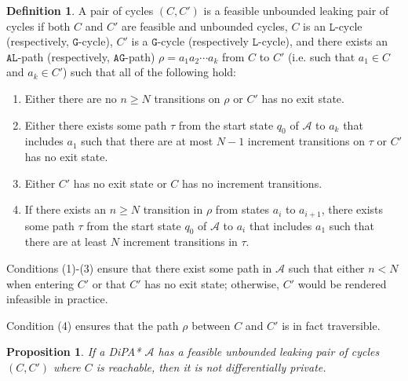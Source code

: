\documentclass[12pt]{article}
\newtheorem{prop}[thm]{Proposition}
\theoremstyle{definition}
\newtheorem{defn}[thm]{Definition}
\begin{document}
\begin{defn}
	A pair of cycles $(C, C')$ is a feasible unbounded leaking pair of cycles if both $C$ and $C'$ are feasible and unbounded cycles, $C$ is an $\texttt{L}$-cycle (respectively, $\texttt{G}$-cycle), $C'$ is a $\texttt{G}$-cycle (respectively $\texttt{L}$-cycle), and there exists an $\texttt{AL}$-path (respectively, $\texttt{AG}$-path) $\rho = a_1 a_2\cdots a_k$ from $C$ to $C'$ (i.e. such that $a_1\in C$ and $a_k \in C'$) such that all of the following hold:
	\begin{enumerate}
		\item Either there are no $n \geq N$ transitions on $\rho$ or $C'$ has no exit state.
		\item Either there exists some path $\tau$ from the start state $q_0$ of $\mathcal{A}$ to $a_k$ that includes $a_1$ such that there are at most $N-1$ increment transitions on $\tau$ or $C'$ has no exit state.
		\item Either $C'$ has no exit state or $C$ has no increment transitions.
		\item If there exists an $n\geq N$ transition in $\rho$ from states $a_i$ to $a_{i+1}$, there exists some path $\tau$ from the start state $q_0$ of $\mathcal{A}$ to $a_i$ that includes $a_1$ such that there are at least $N$ increment transitions in $\tau$.
	\end{enumerate}

	Conditions (1)-(3) ensure that there exist some path in $\mathcal{A}$ such that either $n < N$ when entering $C'$ or that $C'$ has no exit state; otherwise, $C'$ would be rendered infeasible in practice.
	
	Condition (4) ensures that the path $\rho$ between $C$ and $C'$ is in fact traversible. 

	
\end{defn}

\begin{prop}
	If a DiPA* $\mathcal{A}$ has a feasible unbounded leaking pair of cycles $(C, C')$ where $C$ is reachable, then it is not differentially private.
\end{prop}
\end{document}
